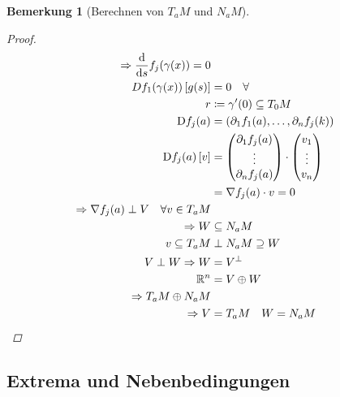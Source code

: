 \documentclass[11pt, twoside, a4paper]{article}
\theoremstyle{plain}
\newtheorem{bemerkung}[blockelement]{Bemerkung}
\numberwithin{equation}{subsection}
\newcommand{\pair}[1]{\left(#1\right)}
\newcommand{\of}[1]{\mathopen{}\mathclose{}\bgroup\left(#1\aftergroup\egroup\right)}
\newcommand{\interv}[1]{\left[#1\right]}
\newcommand{\impl}[0]{\Rightarrow{}}
\newcommand{\dif}{\mathop{}\!\mathrm{d}}
\newcommand{\anf}[1]{\glqq{}#1\grqq}
\DeclareMathOperator{\D}{D\!}
\newcommand{\R}{\mathbb{R}}
\begin{document}
\begin{bemerkung}[\anf{Berechnen} von $T_a M$ und $N_a M$]
\begin{proof}
\begin{align*}
                \impl \frac{\dif}{\dif s} f_j\of{\gamma\of{x}} = 0\\
                D f_1\of{\gamma\of{x}}\interv{g\of{s}} &= 0\quad\forall\\
                r &\coloneqq \gamma'\of{0} \subseteq T_0 M\\
                \D f_j\of{a} &= \pair{\partial_1 f_1\of{a}, \ldots, \partial_n f_j\of{k}}\\
                \D f_j\of{a}\interv{v} &= \begin{pmatrix}
                                              \partial_1 f_j\of{a} \\
                                              \vdots               \\
                                              \partial_n f_j\of{a}
                \end{pmatrix}\cdot\begin{pmatrix}
                                      v_1    \\
                                      \vdots \\
                                      v_n
                \end{pmatrix}\\
                &= \nabla f_j\of{a} \cdot v = 0\\
                \impl \nabla f_j\of{a} \perp V\quad\forall v\in T_a M\\
                \impl W &\subseteq N_a M\\
                v \subseteq T_a M &\perp N_a M \supseteq W\\
                V \perp W \impl W &= V^{\perp}\\
                \R^n &= V\oplus W\\
                \impl T_a M \oplus N_a M\\
                \impl V &= T_a M\quad W = N_a M\qedhere
            \end{align*}
        \end{proof}
    \end{bemerkung}

    \subsection{Extrema und Nebenbedingungen}
\end{document}
